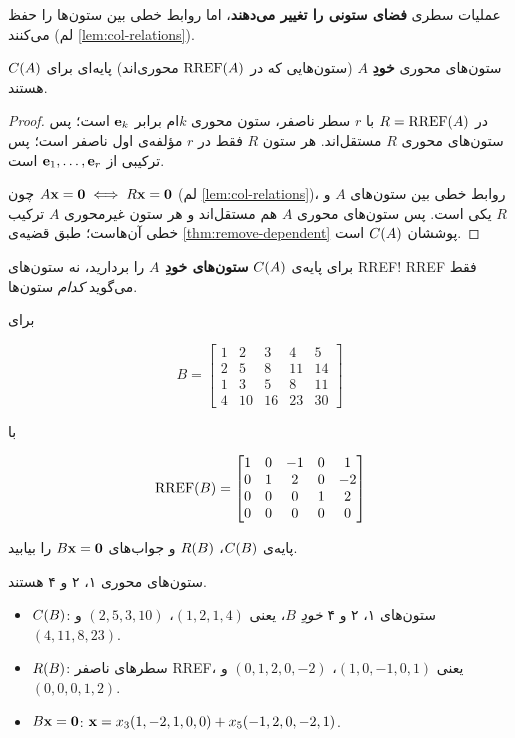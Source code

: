 \begin{warning}
عملیات سطری  \textbf{فضای ستونی  را تغییر می‌دهند}، اما روابط خطی بین ستون‌ها را حفظ می‌کنند (لم \ref{lem:col-relations}).
\end{warning}

\begin{theorem}\label{thm:pivot-cols-basis}
ستون‌های محوری  \textbf{خودِ} $A$ (ستون‌هایی که در $\operatorname{RREF}(A)$ محوری‌اند) پایه‌ای برای $C(A)$ هستند.
\end{theorem}
\begin{proof}
در $R=\operatorname{RREF}(A)$ با $r$ سطر ناصفر، ستون محوری  $k$ام برابر $\mathbf{e}_k$ است؛ پس ستون‌های محوری $R$ مستقل‌اند. هر ستون $R$ فقط در $r$ مؤلفه‌ی اول ناصفر است؛ پس ترکیبی از $\mathbf{e}_1,\dots,\mathbf{e}_r$ است.

چون $A\mathbf{x}=\mathbf{0}\iff R\mathbf{x}=\mathbf{0}$ (لم \ref{lem:col-relations})، روابط خطی بین ستون‌های $A$ و $R$ یکی است. پس ستون‌های محوری $A$ هم مستقل‌اند و هر ستون غیرمحوری $A$ ترکیب خطی آن‌هاست؛ طبق قضیه‌ی \ref{thm:remove-dependent} پوششان $C(A)$ است.
\end{proof}

\begin{warning}
برای پایه‌ی $C(A)$ \textbf{ستون‌های خودِ $A$} را بردارید، نه ستون‌های RREF! RREF فقط می‌گوید \emph{کدام} ستون‌ها.
\end{warning}

\begin{example}
برای
 
\[
B=\begin{bmatrix}1&2&3&4&5\\2&5&8&11&14\\1&3&5&8&11\\4&10&16&23&30\end{bmatrix}
\]

با
 
\[
\operatorname{RREF}(B)=\begin{bmatrix}1&0&-1&0&1\\0&1&2&0&-2\\0&0&0&1&2\\0&0&0&0&0\end{bmatrix}
\]

پایه‌ی $C(B)$، $R(B)$ و جواب‌های $B\mathbf{x}=\mathbf{0}$ را بیابید.
\end{example}
\begin{solution}
ستون‌های محوری ۱، ۲ و ۴ هستند.
\begin{itemize}
  \item $C(B)$: ستون‌های ۱، ۲ و ۴ \emph{خودِ} $B$، یعنی $(1,2,1,4)$، $(2,5,3,10)$ و $(4,11,8,23)$.
  \item $R(B)$: سطرهای ناصفر RREF، یعنی $(1,0,-1,0,1)$، $(0,1,2,0,-2)$ و $(0,0,0,1,2)$.
  \item $B\mathbf{x}=\mathbf{0}$: $\mathbf{x}=x_3(1,-2,1,0,0)+x_5(-1,2,0,-2,1)$.
\end{itemize}
\end{solution}

